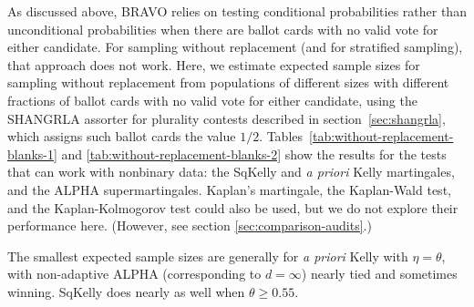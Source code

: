 \documentclass[aoas]{imsart}
\begin{document}
As discussed above, BRAVO relies on testing conditional probabilities
rather than unconditional probabilities when there are ballot cards with no valid vote for either candidate.
For sampling without replacement (and for stratified sampling), that approach does not work.
Here, we estimate expected sample sizes for sampling without replacement from populations of different sizes
with different fractions of ballot cards with no valid vote for either candidate, using the SHANGRLA assorter for plurality
contests described in section~\ref{sec:shangrla}, which assigns such ballot cards the value $1/2$.
Tables~\ref{tab:without-replacement-blanks-1} and \ref{tab:without-replacement-blanks-2} show the
 results for the tests that can work with nonbinary data:
the SqKelly and \emph{a priori} Kelly martingales, and the ALPHA supermartingales. 
Kaplan's martingale, the Kaplan-Wald test, and the Kaplan-Kolmogorov test \citep{stark09b,stark20} could also be used, but we do not explore their performance here.
(However, see section \ref{sec:comparison-audits}.)

The smallest expected sample sizes are generally for \emph{a priori} Kelly with $\eta=\theta$, with non-adaptive ALPHA (corresponding to
$d=\infty$) nearly tied and sometimes winning.
SqKelly does nearly as well when $\theta \ge 0.55$.
\end{document}
